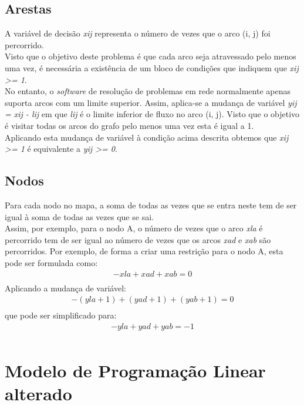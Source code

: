 \documentclass[a4paper]{report}
\begin{document}
\subsection{Arestas}
A variável de decisão \textit{xij} representa o número de vezes que o arco (i,
j) foi percorrido.\\
Visto que o objetivo deste problema é que cada arco seja atravessado pelo menos
uma vez, é necessária a existência de um bloco de condições que indiquem que
\textit{xij >= 1}.\\
No entanto, o \textit{software} de resolução de problemas em rede normalmente
apenas suporta arcos com um limite superior. Assim, aplica-se a mudança de
variável \textit{yij = xij - lij} em que \textit{lij} é o limite inferior de
fluxo no arco (i, j). Visto que o objetivo é visitar todas os arcos do grafo
pelo menos uma vez esta é igual a 1.\\
Aplicando esta mudança de variável à condição acima descrita obtemos que
\textit{xij >= 1} é equivalente a \textit{yij >= 0}.

\subsection{Nodos}
Para cada nodo no mapa, a soma de todas as vezes que se entra neste
tem de ser igual à soma de todas as vezes que se sai.\\
Assim, por exemplo, para o nodo A, o número de vezes que o arco \textit{xla} é
percorrido tem de ser igual ao número de vezes que os arcos \textit{xad} e
\textit{xab} são percorridos.
Por exemplo, de forma a criar uma restrição para o nodo A, esta pode ser
formulada como:\\
\begin{multline}
- xla + xad + xab = 0 \\
\end{multline}
Aplicando a mudança de variável:
\begin{multline}
- (yla + 1) + (yad +1) + (yab +1) = 0 \\
\end{multline}
que pode ser simplificado para:
\begin{multline}
- yla + yad + yab = -1\\
\end{multline}

\pagebreak
\section{Modelo de Programação Linear alterado}

\end{document}
